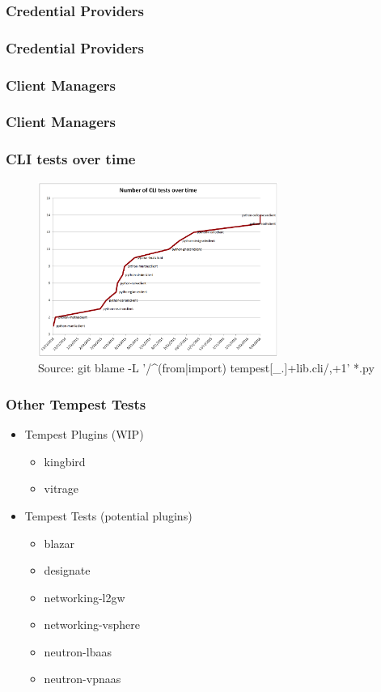 \documentclass[aspectratio=169,11pt,hyperref={colorlinks=true}]{beamer}
\begin{document}
\begin{frame}
    \frametitle{Credential Providers}
\end{frame}

\begin{frame}
    \frametitle{Credential Providers}
\end{frame}

\begin{frame}
    \frametitle{Client Managers}
\end{frame}

\begin{frame}
    \frametitle{Client Managers}
\end{frame}

\begin{frame}
    \frametitle{CLI tests over time}
    \begin{figure}[p]
    	\centering
    	\includegraphics[width=0.7\textwidth]{cli-tests.png}
        \caption{Source: git blame -L '/\^{}(from|import) tempest[\_.]+lib.cli/,+1' *.py}
    \end{figure}
\end{frame}

\begin{frame}
    \frametitle{Other Tempest Tests}
    \begin{itemize}
        \item{Tempest Plugins (WIP)}
            \begin{itemize}
                \item{kingbird}
                \item{vitrage}
            \end{itemize}
    \end{itemize}
    \begin{itemize}
        \item{Tempest Tests (potential plugins)}
            \begin{itemize}
                \item{blazar}
                \item{designate}
                \item{networking-l2gw}
                \item{networking-vsphere}
                \item{neutron-lbaas}
                \item{neutron-vpnaas}
            \end{itemize}
    \end{itemize}
\end{frame}
\end{document}
